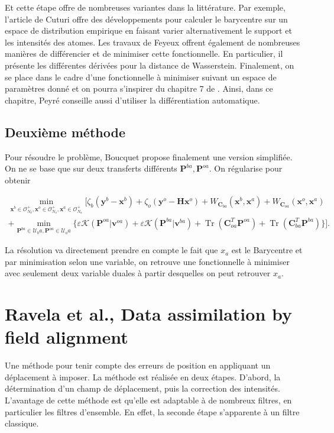 \documentclass{article}
\newcommand{\bH}{\bm{H}}
\newcommand{\bC}{\bm{C}}
\newcommand{\bx}{\bm{x}}
\newcommand{\bP}{\bm{P}}
\newcommand{\by}{\bm{y}}
\newcommand{\bv}{\bm{v}}
\DeclareMathOperator{\Tr}{Tr}
\begin{document}
Et cette étape offre de nombreuses variantes dans la littérature. Par exemple, l'article de Cuturi \cite{cuturi_fast_2014} offre des développements pour calculer le barycentre sur un espace de distribution empirique en faisant varier alternativement le support et les intensités des atomes. Les travaux de Feyeux \cite{feyeux_transport_nodate} offrent également de nombreuses manières de différencier et de minimiser cette fonctionnelle. En particulier, il présente les différentes dérivées pour la distance de Wasserstein.
Finalement, on se place dans le cadre d'une fonctionnelle à minimiser suivant un espace de paramètres donné et on pourra s'inspirer du chapitre 7 de \cite{peyre_computational_2020}. Ainsi, dans ce chapitre, Peyré conseille aussi d'utiliser la différentiation automatique.

\subsection{Deuxième méthode}

Pour résoudre le problème, Boucquet propose finalement une version simplifiée. On ne se base que sur deux transferts différents $\bP^{ba}, \bP^{oa}$.
On régularise pour obtenir

\begin{eqnarray*}
    \min_{\bx^b \in \mathcal O_{N_b}^+, \bx^o \in \mathcal O_{N_o}^+, \bx^a \in \mathcal O_{N_a}^+} [\zeta_b(\by^b - \bx^b) + \zeta_o(\by^o - \bH \bx^o) + W_{\bC_{ba}}(\bx^b, \bx^a) + W_{\bC_{oa}}(\bx^o, \bx^a) \\
        + \min_{\bP^{ba} \in \mathcal{U}_ba, \bP^{oa} \in \mathcal{U}_oa} \{\varepsilon \mathcal K (\bP^{oa}|\bv^{oa}) + \varepsilon \mathcal K (\bP^{ba}|\bv^{ba}) + \Tr(\bC_{oa}^T \bP^{oa}) + \Tr(\bC_{ba}^T \bP^{ba})\}].
\end{eqnarray*}


La résolution va directement prendre en compte le fait que $x_a$ est le Barycentre et par minimisation selon une variable, on retrouve une fonctionnelle à minimiser avec seulement deux variable duales à partir desquelles on peut retrouver $x_a$.

\section{Ravela et al., Data assimilation by field alignment}

Une méthode pour tenir compte des erreurs de position en appliquant un déplacement à imposer. La méthode est réalisée en deux étapes. D'abord, la détermination d'un champ de déplacement, puis la correction des intensités. L'avantage de cette méthode est qu'elle est adaptable à de nombreux filtres, en particulier les filtres d'ensemble. En effet, la seconde étape s'apparente à un filtre classique.
\end{document}
